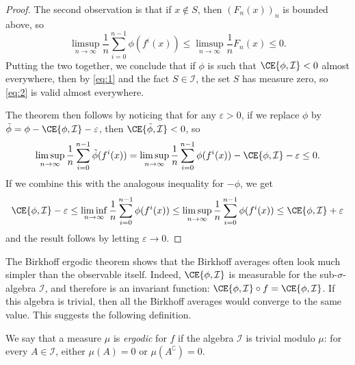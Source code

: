 \documentclass[../main]{subfiles}
\begin{document}
\begin{proof}
  The second observation is that if \(x \notin S\), then \((F_n(x))_n\) is bounded above, so
  \begin{equation}\label{eq:2}
    \limsup_{n \to \infty} \frac{1}{n}\sum_{i = 0}^{n - 1} \phi(f^i(x)) \le \limsup_{n \to \infty} \frac{1}{n}F_n(x) \le 0.
  \end{equation}
  Putting the two together, we conclude that if \(\phi\) is such that \(\CE{\phi, \mathcal{I}} < 0\) almost everywhere, then by  \cref{eq:1} and the fact \(S \in \mathcal{I}\), the set \(S\) has measure zero, so  \cref{eq:2} is valid almost everywhere.

  The theorem then follows by noticing that for  any \(\varepsilon > 0\), if we replace \(\phi\) by \(\tilde{\phi} = \phi - {\CE{\phi,\mathcal{I}}} - \varepsilon\), then \(\CE{\tilde{\phi}, \mathcal{I}} < 0\), so
  \begin{equation*}
    \limsup_{n \to \infty} \frac{1}{n}\sum_{i = 0}^{n - 1} \tilde\phi(f^i(x))
    = \limsup_{n \to \infty} \frac{1}{n}\sum_{i = 0}^{n - 1} \phi(f^i(x)) - \CE{\phi,\mathcal{I}} - \varepsilon \le 0.
  \end{equation*}
  If we combine this with the analogous inequality for \(-\phi\), we get
  \begin{equation*}
    \CE{\phi,\mathcal{I}} - \varepsilon \le \liminf_{n \to \infty} \frac{1}{n}\sum_{i = 0}^{n - 1} \phi(f^i(x)) \le 
    \limsup_{n \to \infty} \frac{1}{n}\sum_{i = 0}^{n - 1} \phi(f^i(x)) \le  \CE{\phi,\mathcal{I}} + \varepsilon
  \end{equation*}
  and the result follows by letting \(\varepsilon \to 0\).
\end{proof}

The Birkhoff ergodic theorem shows that the Birkhoff averages often look much simpler than the observable itself. Indeed, \(\CE{\phi,\mathcal{I}}\) is measurable for the sub-\(\sigma\)-algebra \(\mathcal{I}\), and therefore is an invariant function: \(\CE{\phi,\mathcal{I}} \circ f = \CE{\phi,\mathcal{I}}\). If this algebra is trivial, then all the Birkhoff averages would converge to the same value. This suggests the following definition.

\begin{definition}
  We say that a measure \(\mu\) is \emph{ergodic} for \(f\) if the algebra \(\mathcal{I}\) is trivial modulo \(\mu\): for every \(A \in \mathcal{I}\), either \(\mu(A) = 0\) or \(\mu(A^{\complement}) = 0\).
\end{definition}
\end{document}
